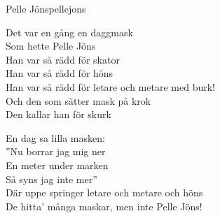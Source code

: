 \begin{song}{Pelle Jöns}{pellejons}
\begin{vers}
Det var en gång en daggmask\\
Som hette Pelle Jöns\\
Han var så rädd för skator\\
Han var så rädd för höns\\
Han var så rädd för letare och metare med burk!\\
Och den som sätter mask på krok\\
Den kallar han för skurk\\
\end{vers}
\begin{vers}
En dag sa lilla masken:\\
''Nu borrar jag mig ner\\
En meter under marken\\
Så syns jag inte mer''\\
Där uppe springer letare och metare och höns\\
De hitta' många maskar, men inte Pelle Jöns!\\
\end{vers}
\end{song}
